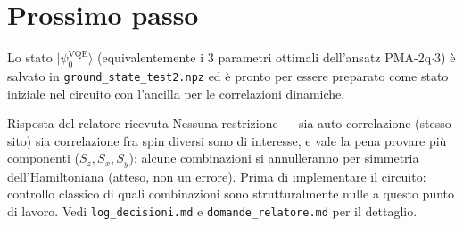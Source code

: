 \documentclass[11pt,a4paper]{article}
\begin{document}
\section*{Prossimo passo}

Lo stato $|\psi_0^\text{VQE}\rangle$ (equivalentemente i 3 parametri
ottimali dell'ansatz PMA-2q$\cdot$3) è salvato in
\texttt{ground\_state\_test2.npz} ed è pronto per essere preparato come
stato iniziale nel circuito con l'ancilla per le correlazioni
dinamiche.

\begin{advisorbox}{Risposta del relatore ricevuta}
Nessuna restrizione --- sia auto-correlazione (stesso sito) sia
correlazione fra spin diversi sono di interesse, e vale la pena provare
più componenti ($S_z,S_x,S_y$); alcune combinazioni si annulleranno per
simmetria dell'Hamiltoniana (atteso, non un errore). Prima di
implementare il circuito: controllo classico di quali combinazioni sono
strutturalmente nulle a questo punto di lavoro. Vedi
\texttt{log\_decisioni.md} e \texttt{domande\_relatore.md} per il
dettaglio.
\end{advisorbox}
\end{document}
